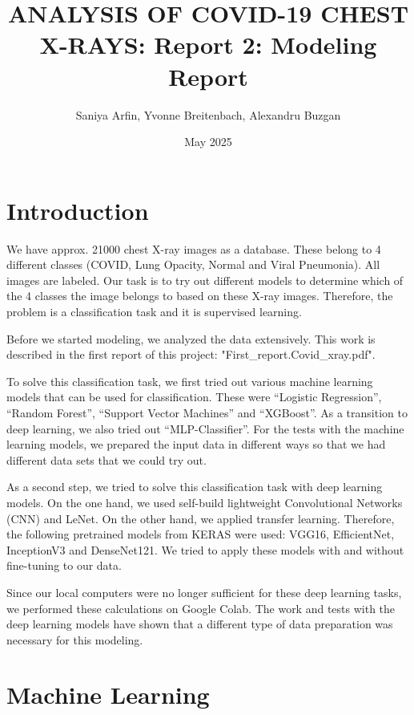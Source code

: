 \documentclass{article}
\title{ANALYSIS OF COVID-19 CHEST X-RAYS: Report 2: Modeling Report}
\author{Saniya Arfin, Yvonne Breitenbach, Alexandru Buzgan}
\date{May 2025}
\begin{document}
\maketitle

\tableofcontents

\newpage 

\section{Introduction}

We have approx. 21000 chest X-ray images as a database. These belong to 4 different classes (COVID, Lung Opacity, Normal and Viral Pneumonia). All images are labeled. Our task is to try out different models to determine which of the 4 classes the image belongs to based on these X-ray images. Therefore, the problem is a classification task and it is supervised learning. 

Before we started modeling, we analyzed the data extensively. This work is described in the first report of this project: "First\_report.Covid\_xray.pdf".

To solve this classification task, we first tried out various machine learning models that can be used for classification. 
These were “Logistic Regression”, “Random Forest”, “Support Vector Machines” and “XGBoost”. As a transition to deep learning, we also tried out “MLP-Classifier”. 
For the tests with the machine learning models, we prepared the input data in different ways so that we had different data sets that we could try out.

As a second step, we tried to solve this classification task with deep learning models. On the one hand, we used self-build lightweight Convolutional Networks (CNN) and LeNet. On the other hand, we applied transfer learning. Therefore, the following pretrained models from KERAS were used: VGG16, EfficientNet, InceptionV3 and DenseNet121. We tried to apply these models with and without fine-tuning to our data. 

Since our local computers were no longer sufficient for these deep learning tasks, we performed these calculations on Google Colab. The work and tests with the deep learning models have shown that a different type of data preparation was necessary for this modeling. 

\section{Machine Learning}
\end{document}
